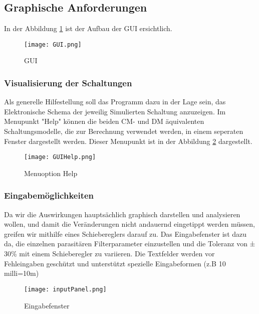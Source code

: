 \subsection{Graphische Anforderungen} \label{subsec:graphischeanforderungen}
In der Abbildung \ref{fig:GUI} ist der Aufbau der GUI ersichtlich.

\begin{figure}[H]
	\centering
	\texttt{[image: GUI.png]}
	\caption{GUI}
	\label{fig:GUI}
\end{figure}

\bigskip
\subsubsection{Visualisierung der Schaltungen} \label{subsubsec:visualisierungderschaltungen}
Als generelle Hilfestellung soll das Programm dazu in der Lage sein, das Elektronische Schema der jeweilig Simulierten Schaltung anzuzeigen.
Im Menupunkt "Help" können die beiden CM- und DM äquivalenten Schaltungsmodelle, die zur Berechnung verwendet werden, in einem seperaten Fenster dargestellt werden. Dieser Menupunkt ist in der Abbildung \ref{fig:GUIHelp}  dargestellt.

\begin{figure}[H]
	\centering
	\texttt{[image: GUIHelp.png]}
	\caption{Menuoption Help}
	\label{fig:GUIHelp}
\end{figure}
\bigskip

\subsubsection{Eingabemöglichkeiten}\label{subsubsec:eingabemöglichkeiten}
Da wir  die Auswirkungen hauptsächlich graphisch darstellen und analysieren wollen, und damit die Veränderungen nicht andauernd eingetippt werden müssen, greifen wir mithilfe eines Schiebereglers darauf zu. Das Eingabefenster ist dazu da, die einzelnen parasitären Filterparameter einzustellen und die Toleranz von ± 30\% mit einem Schieberegler zu variieren. Die Textfelder werden vor Fehleingaben geschützt und unterstützt spezielle Eingabeformen (z.B 10 milli=10m)
\begin{figure}[H]
	\centering
	\texttt{[image: inputPanel.png]}
	\caption{Eingabefenster}
	\label{fig:GUIinputPanel}
\end{figure}
\bigskip

